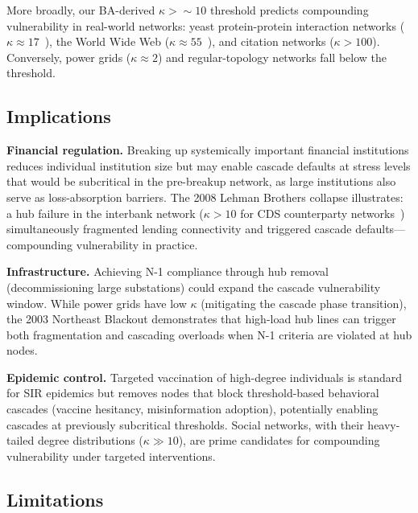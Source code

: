 \documentclass[aps,pre,twocolumn,superscriptaddress,showpacs]{revtex4-2}
\begin{document}
More broadly, our BA-derived $\kappa > {\sim}10$ threshold predicts compounding vulnerability in real-world networks: yeast protein-protein interaction networks ($\kappa \approx 17$~\cite{Jeong2001}), the World Wide Web ($\kappa \approx 55$~\cite{Albert1999}), and citation networks ($\kappa > 100$). Conversely, power grids ($\kappa \approx 2$) and regular-topology networks fall below the threshold.

\subsection{Implications}
\label{sec:implications}

\textbf{Financial regulation.} Breaking up systemically important financial institutions reduces individual institution size but may enable cascade defaults at stress levels that would be subcritical in the pre-breakup network, as large institutions also serve as loss-absorption barriers. The 2008 Lehman Brothers collapse illustrates: a hub failure in the interbank network ($\kappa > 10$ for CDS counterparty networks~\cite{Battiston2012,Haldane2011}) simultaneously fragmented lending connectivity and triggered cascade defaults---compounding vulnerability in practice.

\textbf{Infrastructure.} Achieving N-1 compliance through hub removal (decommissioning large substations) could expand the cascade vulnerability window. While power grids have low $\kappa$ (mitigating the cascade phase transition), the 2003 Northeast Blackout demonstrates that high-load hub lines can trigger both fragmentation and cascading overloads when N-1 criteria are violated at hub nodes.

\textbf{Epidemic control.} Targeted vaccination of high-degree individuals is standard for SIR epidemics but removes nodes that block threshold-based behavioral cascades (vaccine hesitancy, misinformation adoption), potentially enabling cascades at previously subcritical thresholds. Social networks, with their heavy-tailed degree distributions ($\kappa \gg 10$), are prime candidates for compounding vulnerability under targeted interventions.

\subsection{Limitations}
\label{sec:limitations}
\end{document}
